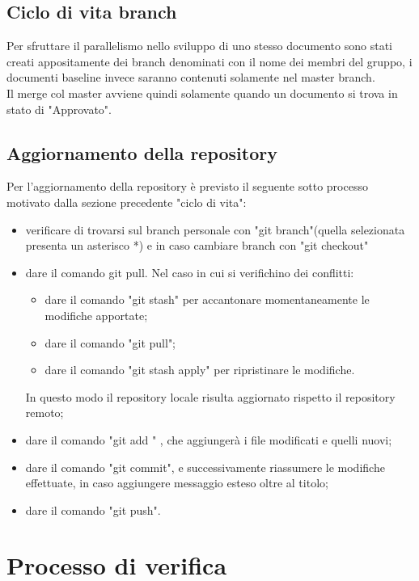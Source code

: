 \documentclass[NormeDiProgetto.tex]{subfiles}
\begin{document}
	\subsection{Ciclo di vita branch}
	Per sfruttare il parallelismo nello sviluppo di uno stesso documento sono stati creati appositamente dei branch denominati con il nome dei membri del gruppo, i documenti baseline invece saranno contenuti solamente nel master branch.\\
	Il merge col master avviene quindi solamente quando un documento si trova in stato di "Approvato".
	
	\subsection{Aggiornamento della repository}
	Per l’aggiornamento della repository è previsto il seguente sotto processo motivato dalla sezione precedente "ciclo di vita":
	\begin{itemize}
		\item verificare di trovarsi sul branch personale con "git branch"(quella selezionata presenta un asterisco *) e in caso cambiare branch con "git checkout"
		\item dare il comando git pull. Nel caso in cui si verifichino dei conflitti:
		\begin{itemize}
			\item dare il comando "git stash" per accantonare momentaneamente	le modifiche apportate;
			\item dare il comando "git pull";
			\item dare il comando "git stash apply" per ripristinare le modifiche.
		\end{itemize}	In questo modo il repository locale risulta aggiornato rispetto il repository remoto;
	
		\item dare il comando "git add \textasteriskcentered" , che aggiungerà i file modificati e quelli nuovi;
		\item dare il comando "git commit", e successivamente riassumere le modifiche effettuate, in caso aggiungere messaggio esteso oltre al titolo;
		\item dare il comando "git push".
	\end{itemize}
	
	\section{Processo di verifica}
	
\end{document}
